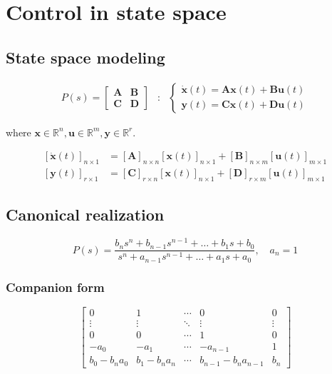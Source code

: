 \section*{Control in state space}
\subsection*{State space modeling}
\begin{eqnarray*}
P\left(s\right)=\left[\begin{array}{c|c}
\boldsymbol{A} & \boldsymbol{B}\\
\hline \boldsymbol{C} & \boldsymbol{D}
\end{array}\right] & : & \begin{cases}
\dot{\boldsymbol{x}}\left(t\right)=\boldsymbol{A}\boldsymbol{x}\left(t\right)+\boldsymbol{B}\boldsymbol{u}\left(t\right)\\
\boldsymbol{y}\left(t\right)=\boldsymbol{C}\boldsymbol{x}\left(t\right)+\boldsymbol{D}\boldsymbol{u}\left(t\right)
\end{cases}
\end{eqnarray*}

where $\boldsymbol{x}\in\mathbb{R}^{n},\boldsymbol{u}\in\mathbb{R}^{m},\boldsymbol{y}\in\mathbb{R}^{r}$. 

\begin{align*}
\left[\dot{\boldsymbol{x}}\left(t\right)\right]_{n\times1} & =\left[\boldsymbol{A}\right]_{n\times n}\left[\boldsymbol{x}\left(t\right)\right]_{n\times1}+\left[\boldsymbol{B}\right]_{n\times m}\left[\boldsymbol{u}\left(t\right)\right]_{m\times1}\\
\left[\boldsymbol{y}\left(t\right)\right]_{r\times1} & =\left[\boldsymbol{C}\right]_{r\times n}\left[\boldsymbol{x}\left(t\right)\right]_{n\times1}+\left[\boldsymbol{D}\right]_{r\times m}\left[\boldsymbol{u}\left(t\right)\right]_{m\times1}
\end{align*}

\subsection*{Canonical realization}
\[
P(s) = \frac{b_ns^n + b_{n-1}s^{n-1} + \ldots + b_1s + b_0}{s^n + a_{n-1}s^{n-1} + \ldots + a_1s + a_0}, \quad a_n = 1
\]
\subsubsection*{Companion form}
\[
\left[\begin{array}{cccc|c}
0 & 1 & \cdots & 0 & 0\\
\vdots & \vdots & \ddots & \vdots & \vdots\\
0 & 0 & \cdots & 1 & 0\\
-a_{0} & -a_{1} & \cdots & -a_{n-1} & 1\\
\hline b_{0}-b_{n}a_{0} & b_{1}-b_{n}a_{n} & \cdots & b_{n-1}-b_{n}a_{n-1} & b_{n}
\end{array}\right]
\]

